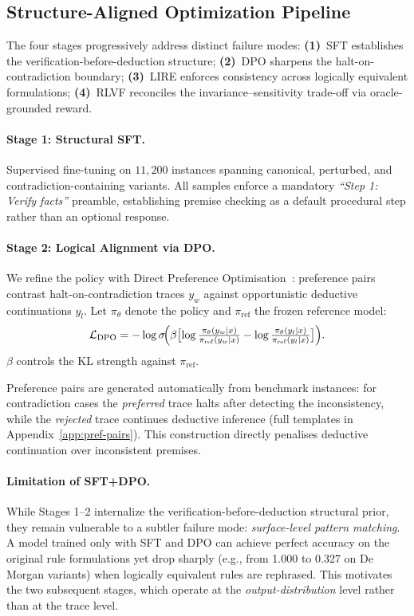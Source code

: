 \documentclass{article}
\begin{document}
\subsection{Structure-Aligned Optimization Pipeline}
\label{sec:pipeline}

The four stages progressively address distinct failure modes: \textbf{(1)}~SFT establishes the verification-before-deduction structure; \textbf{(2)}~DPO sharpens the halt-on-contradiction boundary; \textbf{(3)}~LIRE enforces consistency across logically equivalent formulations; \textbf{(4)}~RLVF reconciles the invariance--sensitivity trade-off via oracle-grounded reward.

\paragraph{Stage 1: Structural SFT.} Supervised fine-tuning on $11{,}200$ instances spanning canonical, perturbed, and contradiction-containing variants. All samples enforce a mandatory \textit{``Step 1: Verify facts''} preamble, establishing premise checking as a default procedural step rather than an optional response.

\paragraph{Stage 2: Logical Alignment via DPO.} We refine the policy with Direct Preference Optimisation~\citep{rafailov2023direct}: preference pairs contrast halt-on-contradiction traces $y_w$ against opportunistic deductive continuations $y_l$. Let $\pi_\theta$ denote the policy and $\pi_{\mathrm{ref}}$ the frozen reference model:
\begin{equation}
\mathcal{L}_{\mathrm{DPO}} = -\log\sigma\!\Bigl(\beta\bigl[\log\tfrac{\pi_\theta(y_w|x)}{\pi_{\mathrm{ref}}(y_w|x)} - \log\tfrac{\pi_\theta(y_l|x)}{\pi_{\mathrm{ref}}(y_l|x)}\bigr]\Bigr).
\label{eq:dpo}
\end{equation}
$\beta$ controls the KL strength against $\pi_{\mathrm{ref}}$.

Preference pairs are generated automatically from benchmark instances: for contradiction cases the \emph{preferred} trace halts after detecting the inconsistency, while the \emph{rejected} trace continues deductive inference (full templates in Appendix~\ref{app:pref-pairs}). This construction directly penalises deductive continuation over inconsistent premises.

\paragraph{Limitation of SFT+DPO.}
While Stages 1--2 internalize the verification-before-deduction structural prior, they remain vulnerable to a subtler failure mode: \textit{surface-level pattern matching}. A model trained only with SFT and DPO can achieve perfect accuracy on the original rule formulations yet drop sharply (e.g., from 1.000 to 0.327 on De Morgan variants) when logically equivalent rules are rephrased. This motivates the two subsequent stages, which operate at the \emph{output-distribution} level rather than at the trace level.
\end{document}
